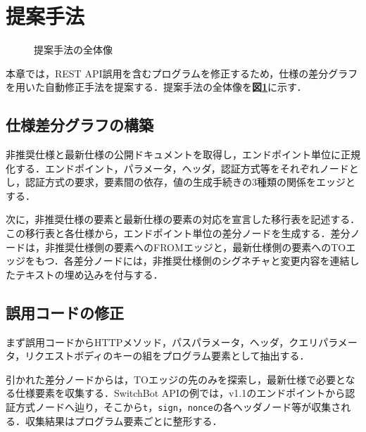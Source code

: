 \section{提案手法}

\begin{figure}[t]
\centering
\caption{提案手法の全体像}
\label{fig:overview}
\end{figure}

本章では，REST API誤用を含むプログラムを修正するため，仕様の差分グラフを用いた自動修正手法を提案する．提案手法の全体像を\textbf{図\ref{fig:overview}}に示す．

\subsection{仕様差分グラフの構築}
非推奨仕様と最新仕様の公開ドキュメントを取得し，エンドポイント単位に正規化する．エンドポイント，パラメータ，ヘッダ，認証方式等をそれぞれノードとし，認証方式の要求，要素間の依存，値の生成手続きの3種類の関係をエッジとする．

次に，非推奨仕様の要素と最新仕様の要素の対応を宣言した移行表を記述する．この移行表と各仕様から，エンドポイント単位の差分ノードを生成する．差分ノードは，非推奨仕様側の要素へのFROMエッジと，最新仕様側の要素へのTOエッジをもつ．各差分ノードには，非推奨仕様側のシグネチャと変更内容を連結したテキストの埋め込みを付与する．

\subsection{誤用コードの修正}
まず誤用コードからHTTPメソッド，パスパラメータ，ヘッダ，クエリパラメータ，リクエストボディのキーの組をプログラム要素として抽出する．


引かれた差分ノードからは，TOエッジの先のみを探索し，最新仕様で必要となる仕様要素を収集する．SwitchBot APIの例では，v1.1のエンドポイントから認証方式ノードへ辿り，そこから\texttt{t}，\texttt{sign}，\texttt{nonce}の各ヘッダノード等が収集される．収集結果はプログラム要素ごとに整形する．
